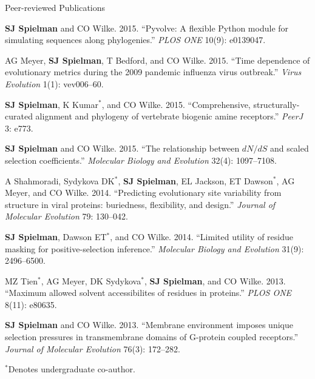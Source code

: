 \documentclass{resume} %
\begin{document}
\begin{rSection}{Peer-reviewed Publications}
\begin{etaremune}[leftmargin=1.5em]
\item \textbf{SJ Spielman} and CO Wilke. 2015. ``Pyvolve: A flexible Python module for simulating sequences along phylogenies.'' \emph{PLOS ONE} 10(9): e0139047.

\item AG Meyer, \textbf{SJ Spielman}, T Bedford, and CO Wilke. 2015. ``Time dependence of evolutionary metrics during the 2009 pandemic influenza virus outbreak.'' \emph{Virus Evolution} 1(1): vev006--60.

\item \textbf{SJ Spielman}, K Kumar$^\ast$, and CO Wilke. 2015. ``Comprehensive, structurally-curated alignment and phylogeny of vertebrate biogenic amine receptors.'' \emph{PeerJ} 3: e773.

\item \textbf{SJ Spielman} and CO Wilke. 2015. ``The relationship between $dN/dS$ and scaled selection coefficients.'' \emph{Molecular Biology and Evolution} 32(4): 1097--7108.

\item A Shahmoradi, Sydykova DK$^\ast$, \textbf{SJ Spielman}, EL Jackson, ET Dawson$^\ast$, AG Meyer, and CO Wilke. 2014. ``Predicting evolutionary site variability from structure in viral proteins: buriedness, flexibility, and design.'' \emph{Journal of Molecular Evolution} 79: 130--042.

\item \textbf{SJ Spielman}, Dawson ET$^\ast$, and CO Wilke. 2014. ``Limited utility of residue masking for positive-selection inference.'' \emph{Molecular Biology and Evolution} 31(9): 2496--6500.

\item MZ Tien$^\ast$, AG Meyer, DK Sydykova$^\ast$, \textbf{SJ Spielman}, and CO Wilke. 2013. ``Maximum allowed solvent accessibilites of residues in proteins.'' \emph{PLOS ONE} 8(11): e80635.

\item \textbf{SJ Spielman} and CO Wilke. 2013. ``Membrane environment imposes unique selection pressures in transmembrane domains of G-protein coupled receptors.'' \emph{Journal of Molecular Evolution} 76(3): 172--282.

\end{etaremune}

$^\ast$Denotes undergraduate co-author.
\end{rSection}
\end{document}
